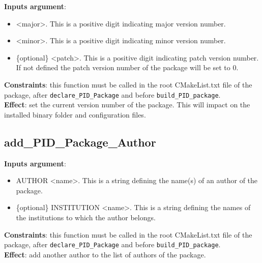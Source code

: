 \documentclass[12pt,a4paper]{article}
\begin{document}
\textbf{Inputs argument}:
\begin{itemize}
\item <major>. This is a positive digit indicating major version number.
\item <minor>. This is a positive digit indicating minor version number.
\item \{optional\} <patch>. This is a positive digit indicating patch version number. If not defined the patch version number of the package will be set to 0.
\end{itemize}
\textbf{Constraints}: this function must be called in the root CMakeList.txt file of the package, after \texttt{declare\_PID\_Package} and before \texttt{build\_PID\_package}.\\
\textbf{Effect}: set the current version number of the package. This will impact on the installed binary folder and configuration files.

\subsection{add\_PID\_Package\_Author}

\textbf{Inputs argument}: 
\begin{itemize}
\item AUTHOR <name>. This is a string defining the name(s) of an author of the package.
\item \{optional\} INSTITUTION <name>. This is a string defining the names of the institutions to which the author belongs.
\end{itemize}
\textbf{Constraints}: this function must be called in the root CMakeList.txt file of the package, after \texttt{declare\_PID\_Package} and before \texttt{build\_PID\_package}.\\
\textbf{Effect}: add another author to the list of authors of the package.
\end{document}
